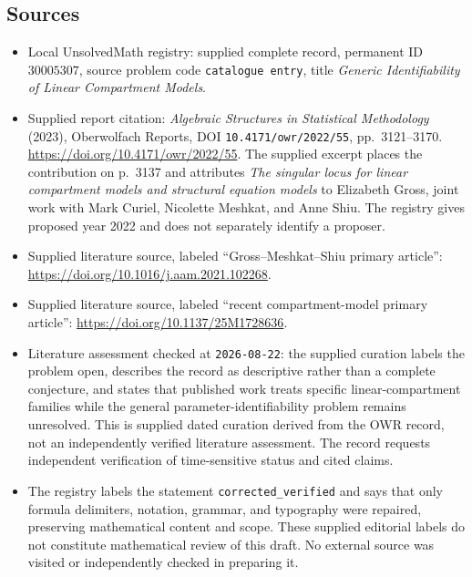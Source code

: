 \documentclass[11pt]{article}
\begin{document}
\subsection{Sources}
\begin{itemize}
\item Local UnsolvedMath registry: supplied complete record, permanent ID \(30005307\), source problem code \texttt{catalogue entry}, title \emph{Generic Identifiability of Linear Compartment Models}.
\item Supplied report citation: \emph{Algebraic Structures in Statistical Methodology} (2023), Oberwolfach Reports, DOI \texttt{10.4171/owr/2022/55}, pp.\ 3121--3170. \url{https://doi.org/10.4171/owr/2022/55}. The supplied excerpt places the contribution on p.\ 3137 and attributes \emph{The singular locus for linear compartment models and structural equation models} to Elizabeth Gross, joint work with Mark Curiel, Nicolette Meshkat, and Anne Shiu. The registry gives proposed year 2022 and does not separately identify a proposer.
\item Supplied literature source, labeled ``Gross--Meshkat--Shiu primary article'': \url{https://doi.org/10.1016/j.aam.2021.102268}.
\item Supplied literature source, labeled ``recent compartment-model primary article'': \url{https://doi.org/10.1137/25M1728636}.
\item Literature assessment checked at \texttt{2026-08-22}: the supplied curation labels the problem open, describes the record as descriptive rather than a complete conjecture, and states that published work treats specific linear-compartment families while the general parameter-identifiability problem remains unresolved. This is supplied dated curation derived from the OWR record, not an independently verified literature assessment. The record requests independent verification of time-sensitive status and cited claims.
\item The registry labels the statement \texttt{corrected\_verified} and says that only formula delimiters, notation, grammar, and typography were repaired, preserving mathematical content and scope. These supplied editorial labels do not constitute mathematical review of this draft. No external source was visited or independently checked in preparing it.
\end{itemize}
\end{document}
